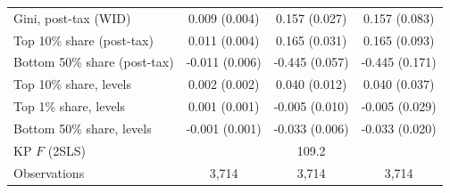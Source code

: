 \begin{tabular}{lccc}
Gini, post-tax (WID) & 0.009\sym{**} (0.004) & 0.157\sym{***} (0.027) & 0.157\sym{*} (0.083) \\
Top 10\% share (post-tax) & 0.011\sym{***} (0.004) & 0.165\sym{***} (0.031) & 0.165\sym{*} (0.093) \\
Bottom 50\% share (post-tax) & -0.011\sym{*} (0.006) & -0.445\sym{***} (0.057) & -0.445\sym{***} (0.171) \\
Top 10\% share, levels & 0.002 (0.002) & 0.040\sym{***} (0.012) & 0.040 (0.037) \\
Top 1\% share, levels & 0.001 (0.001) & -0.005 (0.010) & -0.005 (0.029) \\
Bottom 50\% share, levels & -0.001 (0.001) & -0.033\sym{***} (0.006) & -0.033\sym{*} (0.020) \\
KP $F$ (2SLS) & & 109.2 & \\
\midrule
Observations & 3,714 & 3,714 & 3,714 \\
\bottomrule
\end{tabular}
